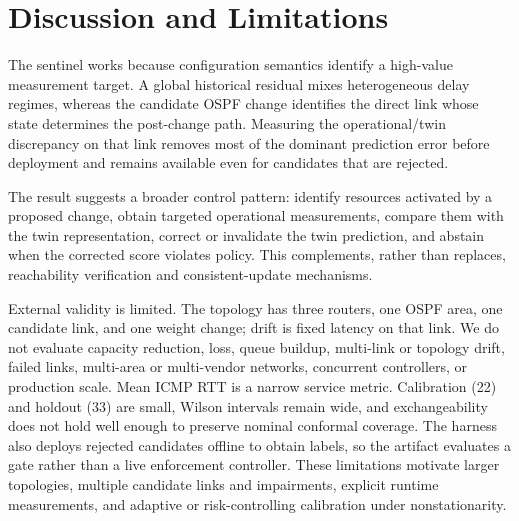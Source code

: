 \section{Discussion and Limitations}

The sentinel works because configuration semantics identify a high-value measurement target. A global historical residual mixes heterogeneous delay regimes, whereas the candidate OSPF change identifies the direct link whose state determines the post-change path. Measuring the operational/twin discrepancy on that link removes most of the dominant prediction error before deployment and remains available even for candidates that are rejected.

The result suggests a broader control pattern: identify resources activated by a proposed change, obtain targeted operational measurements, compare them with the twin representation, correct or invalidate the twin prediction, and abstain when the corrected score violates policy. This complements, rather than replaces, reachability verification and consistent-update mechanisms.

External validity is limited. The topology has three routers, one OSPF area, one candidate link, and one weight change; drift is fixed latency on that link. We do not evaluate capacity reduction, loss, queue buildup, multi-link or topology drift, failed links, multi-area or multi-vendor networks, concurrent controllers, or production scale. Mean ICMP RTT is a narrow service metric. Calibration (22) and holdout (33) are small, Wilson intervals remain wide, and exchangeability does not hold well enough to preserve nominal conformal coverage. The harness also deploys rejected candidates offline to obtain labels, so the artifact evaluates a gate rather than a live enforcement controller. These limitations motivate larger topologies, multiple candidate links and impairments, explicit runtime measurements, and adaptive or risk-controlling calibration under nonstationarity.

